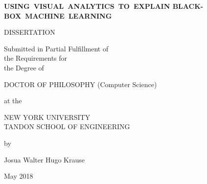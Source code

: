 \documentclass[12pt,letterpaper]{report}
\newcommand{\thesistitle}{USING~VISUAL~ANALYTICS~TO~EXPLAIN
BLACK-BOX~MACHINE~LEARNING}
\newcommand{\thesisauthor}{Josua Walter Hugo Krause}
\newcommand{\graddate}{May 2018} %
\begin{document}
%
\setcounter{page}{1}
\thispagestyle{empty}
%
\begin{center}
{\bfseries 
  {\large\thesistitle}
  \vspace{.25in}
  
  DISSERTATION\\
  \vspace{.25in}
  
  \begin{doublespace}
  Submitted in Partial Fulfillment of\\
  the Requirements for\\
  the Degree of\\
  \end{doublespace}
  \vspace{.25in}
  
  DOCTOR OF PHILOSOPHY (Computer Science)\\
  \vspace{.25in}
  
  at the \\
  \vspace{.1in}
  
  {\large
  NEW YORK UNIVERSITY\\
  \vspace{-0.05in}
  TANDON SCHOOL OF ENGINEERING\\
  }
  \vspace{.2in}
  
  by
  \vspace{.3in}

  \thesisauthor
  \vspace{.3in}

  \graddate
}

\end{center}

\vspace{0.2in}

\noindent
{}
\vspace{0.1in}

\noindent
\makebox[\textwidth]{\hfill\makebox[2.5in]{\hrulefill}}\\
\vspace{0.05in}

\noindent
\makebox[\textwidth]{\hfill\makebox[2.5in]{\hrulefill}}\\
\end{document}
